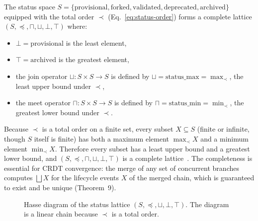 The status space $S = \{\text{provisional}, \text{forked}, \text{validated}, \text{deprecated}, \text{archived}\}$ equipped with the total order $\prec$ (Eq.~\ref{eq:status-order}) forms a complete lattice $(S, \preceq, \sqcap, \sqcup, \bot, \top)$ where:
\begin{itemize}
    \item $\bot = \text{provisional}$ is the least element,
    \item $\top = \text{archived}$ is the greatest element,
    \item the join operator $\sqcup: S \times S \to S$ is defined by $\sqcup = \text{status\_max} = \max_{\prec}$, the least upper bound under $\prec$,
    \item the meet operator $\sqcap: S \times S \to S$ is defined by $\sqcap = \text{status\_min} = \min_{\prec}$, the greatest lower bound under $\prec$.
\end{itemize}
Because $\prec$ is a total order on a finite set, every subset $X \subseteq S$ (finite or infinite, though $S$ itself is finite) has both a maximum element $\max_{\prec} X$ and a minimum element $\min_{\prec} X$. Therefore every subset has a least upper bound and a greatest lower bound, and $(S, \preceq, \sqcap, \sqcup, \bot, \top)$ is a complete lattice~\cite{davey_priestley_2002}. The completeness is essential for CRDT convergence: the merge of any set of concurrent branches computes $\bigsqcup X$ for the lifecycle events $X$ of the merged chain, which is guaranteed to exist and be unique (Theorem~9).

\begin{figure}[htbp]
\centering
{}
\caption{Hasse diagram of the status lattice $(S, \preceq, \sqcup, \bot, \top)$. The diagram is a linear chain because $\prec$ is a total order.}
\label{fig:status-hasse}
\end{figure}

